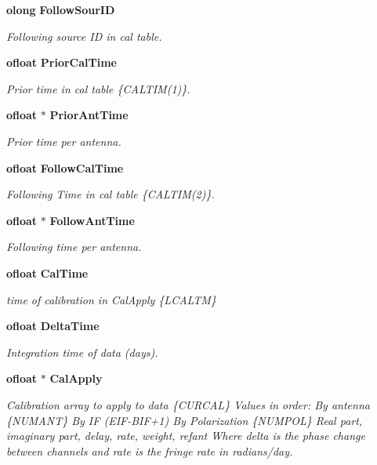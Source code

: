 \begin{CompactItemize}
{\bf olong} {\bf Follow\-Sour\-ID}
\begin{CompactList}\small\item\em Following source ID in cal table. \item\end{CompactList}\item 
{\bf ofloat} {\bf Prior\-Cal\-Time}
\begin{CompactList}\small\item\em Prior time in cal table \{CALTIM(1)\}. \item\end{CompactList}\item 
{\bf ofloat} $\ast$ {\bf Prior\-Ant\-Time}
\begin{CompactList}\small\item\em Prior time per antenna. \item\end{CompactList}\item 
{\bf ofloat} {\bf Follow\-Cal\-Time}
\begin{CompactList}\small\item\em Following Time in cal table \{CALTIM(2)\}. \item\end{CompactList}\item 
{\bf ofloat} $\ast$ {\bf Follow\-Ant\-Time}
\begin{CompactList}\small\item\em Following time per antenna. \item\end{CompactList}\item 
{\bf ofloat} {\bf Cal\-Time}
\begin{CompactList}\small\item\em time of calibration in Cal\-Apply \{LCALTM\} \item\end{CompactList}\item 
{\bf ofloat} {\bf Delta\-Time}
\begin{CompactList}\small\item\em Integration time of data (days). \item\end{CompactList}\item 
{\bf ofloat} $\ast$ {\bf Cal\-Apply}
\begin{CompactList}\small\item\em Calibration array to apply to data \{CURCAL\} Values in order: By antenna \{NUMANT\} By IF (EIF-BIF+1) By Polarization \{NUMPOL\} Real part, imaginary part, delay, rate, weight, refant Where delta is the phase change between channels and rate is the fringe rate in radians/day. \item\end{CompactList}\item 

\end{CompactItemize}
